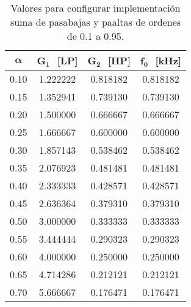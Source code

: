 \begin{table}[!hbp]                                      
\centering   
\caption{Valores para configurar implementación suma de pasabajas y paaltas de ordenes de 0.1 a 0.95.}                            
\label{tab:calculos_bilineal_suma}                                        
\begin{tabular}{cccc}                        
\hline                                              
$\bm{\alpha}$ & $\bm{G_{1}}\,\,$ [LP] & $\bm{G_{2}}\,\,$ [HP] & $\bm{f_{0}}\,\,$ [kHz]  \\            
\hline                                              
0.10 & 1.222222 & 0.818182 & 0.818182 \\ 
                                 
0.15 & 1.352941 & 0.739130 & 0.739130 \\ 
                                 
0.20 & 1.500000 & 0.666667 & 0.666667 \\ 
                                
0.25 & 1.666667 & 0.600000 & 0.600000 \\ 
                                  
0.30 & 1.857143 & 0.538462 & 0.538462 \\ 
                                  
0.35 & 2.076923 & 0.481481 & 0.481481 \\ 
                                  
0.40 & 2.333333 & 0.428571 & 0.428571 \\ 
                               
0.45 & 2.636364 & 0.379310 & 0.379310 \\ 
                                 
0.50 & 3.000000 & 0.333333 & 0.333333 \\ 
                                   
0.55 & 3.444444 & 0.290323 & 0.290323 \\ 
                                  
0.60 & 4.000000 & 0.250000 & 0.250000 \\ 
                                 
0.65 & 4.714286 & 0.212121 & 0.212121 \\ 
                                   
0.70 & 5.666667 & 0.176471 & 0.176471 \\ 
                                  

\end{tabular}
\end{table}

